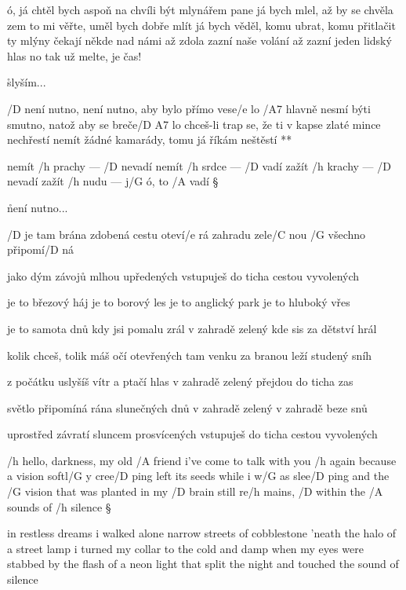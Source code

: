 ó, já chtěl bych aspoň na chvíli být mlynářem
pane já bych mlel, až by se chvěla zem
to mi věřte, uměl bych dobře mlít
já bych věděl, komu ubrat, komu přitlačit
ty mlýny čekají někde nad námi
až zdola zazní naše volání
až zazní jeden lidský hlas
no tak už melte, je čas! \s

\r slyším...




\R  /D není nutno, není nutno, aby bylo přímo vese/e lo
    /A7 hlavně nesmí býti smutno, natož aby se breče/{D A7} lo \s
    chceš-li trap se, že ti v kapse zlaté mince nechřestí
    nemít žádné kamarády, tomu já říkám neštěstí **

nemít /h prachy --- /D nevadí
nemít /h srdce --- /D vadí
zažít /h krachy --- /D nevadí
zažít /h nudu --- j/G ó, to /A vadí \S

\r není nutno...




/D je tam brána zdobená
cestu oteví/e rá
zahradu zele/C nou
/G všechno připomí/D ná \s

jako dým závojů
mlhou upředených
vstupuješ do ticha
cestou vyvolených \s

je to březový háj
je to borový les
je to anglický park
je to hluboký vřes \s

je to samota dnů
kdy jsi pomalu zrál
v zahradě zelený
kde sis za dětství hrál \s

kolik chceš, tolik máš
očí otevřených
tam venku za branou
leží studený sníh \s

z počátku uslyšíš
vítr a ptačí hlas
v zahradě zelený
přejdou do ticha zas \s

světlo připomíná
rána slunečných dnů
v zahradě zelený
v zahradě beze snů \s

uprostřed závratí
sluncem prosvícených
vstupuješ do ticha
cestou vyvolených




/h hello, darkness, my old /A friend
i've come to talk with you /h again
because a vision softl/G y cree/D ping
left its seeds while i w/G as slee/D ping
and the /G vision that was planted in my /D brain
still re/h mains, /D within the /A sounds of /h silence \S

in restless dreams i walked alone
narrow streets of cobblestone
'neath the halo of a street lamp
i turned my collar to the cold and damp
when my eyes were stabbed by the flash of a neon light
that split the night and touched the sound of silence \s

